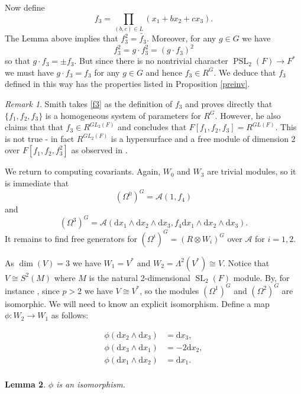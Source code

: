 \documentclass[a4paper]{amsart}
\newcommand{\dd}{\mathrm{d}}
\def\SL{\operatorname{SL}}
\def\PSL{\operatorname{PSL}}
\newtheorem{Lemma}{Lemma}[section]
\newtheorem*{Corollary of Conjecture}{Corollary of Conjecture}
\theoremstyle{definition}
\theoremstyle{remark}
\newtheorem{rem}[Lemma]{Remark}
\theoremstyle{Acknowledgments}
\begin{document}
Now define \begin{equation}\label{f3} f_3 = \prod_{(b,c) \in L} (x_1+bx_2+cx_3).\end{equation} The Lemma above implies that $f_3^2 = \tilde{f_3}$. Moreover, for any $g \in G$ we have
\[f_3^2 = g \cdot f_3^2 = (g \cdot f_3)^2\] so that $g \cdot f_3 = \pm f_3$. But since there is no nontrivial character $\PSL_2(F) \rightarrow F^*$ we must have $g \cdot f_3= f_3$ for any $g \in G$ and hence $f_3 \in R^G$. We deduce that $f_3$ defined in this way has the properties listed in Proposition \ref{preinv}.

\begin{rem}
Smith \cite{Smith2x2} takes \eqref{f3} as the definition of $f_3$ and proves directly that $\{f_1,f_2,f_3\}$ is a homogeneous system of parameters for $R^G$. However, he also claims that that $f_3 \in R^{GL_2(F)}$ and concludes that $F[f_1,f_2,f_3] = R^{GL(F)}$. This is not true - in fact $R^{GL_2(F)}$ is a hypersurface and a free module of dimension 2 over $F[f_1,f_2,f_3^2]$ as observed in \cite{Maithani}.
\end{rem} 

We return to computing covariants. Again, $W_0$ and $W_3$ are trivial modules, so it is immediate that $$(\Omega^0)^G = \mathcal{A}(1,f_4)$$ and $$(\Omega^3)^G = \mathcal{A}( \dd x_1 \wedge \dd x_2 \wedge \dd x_3,f_4 \dd x_1 \wedge \dd x_2 \wedge \dd x_3).$$ It remains to find free generators for $(\Omega^i)^G = (R \otimes W_i)^G$ over $\mathcal{A}$ for $i=1,2$. 

As $\dim(V)=3$ we have $W_1 = V^*$ and $W_2 = \Lambda^2(V^*) \cong V$. Notice that $V \cong S^2(M)$ where $M$ is the natural 2-dimensional $\SL_2(F)$ module. By, for instance \cite{WildonMcDowell}, since $p>2$ we have $V \cong V^*$, so the modules $(\Omega^1)^G$ and $(\Omega^2)^G$ are isomorphic. We will need to know an explicit isomorphism. Define a map $\phi: W_2 \rightarrow W_1$ as follows:

\begin{align*}
\phi(\dd x_2 \wedge \dd x_3) &=  \dd x_3,\\
\phi(\dd x_3 \wedge \dd x_1) &=  -2\dd x_2,\\
\phi(\dd x_1 \wedge \dd x_2) &= \dd x_1.\\
\end{align*}

\begin{Lemma}\label{isom}
$\phi$ is an isomorphism.
\end{Lemma}
\end{document}
